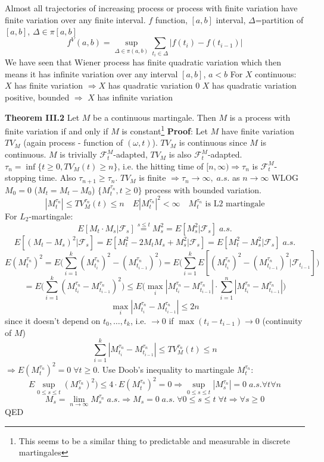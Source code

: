 \documentclass[english]{article}
\newcommand{\note}[1]{\noindent\textbf{#1}}
\newcommand{\F}{\mathcal F}
\begin{document}
Almost all trajectories of increasing process or process with finite variation have finite variation over any finite interval. \newline
$f$ function, $[a,b]$ interval, $\Delta$=partition of $[a,b]$, $\Delta \in \pi[a,b]$
$$f^V(a,b) = \sup_{\Delta \in \pi(a,b)} \sum_{t_i \in \Delta} |f(t_i) - f(t_{i-1})|$$
We have seen that Wiener process has finite quadratic variation which then means it has infinite variation over any interval $[a,b]$, $a<b$ \newline
For $X$ continuous: \newline
$X$ has finite variation $\Rightarrow X$ has quadratic variation $0$ \newline
$X$ has quadratic variation positive, bounded $\Rightarrow$ $X$ has infinite variation \newline

\note{Theorem III.2} Let $M$ be a continuous martingale. Then $M$ is a process with finite variation if and only if $M$ is constant\footnote{This seems to be a similar thing to predictable and measurable in discrete martingales} \newline
\note{Proof}: Let $M$ have finite variation $TV_M$ (again process - function of $(\omega, t)$). $TV_M$ is continuous since $M$ is continuous. $M$ is trivially $\F^M_t$-adapted, $TV_M$ is also $\F^M_t$-adapted. \newline
$\tau_n = \inf\{t\geq 0, TV_M(t) \geq n\}$, i.e. the hitting time of $[n,\infty) \Rightarrow \tau_n$ is $\F^M_t$-stopping time. Also $\tau_{n+1} \geq \tau_n$.\newline
$TV_M$ is finite $\Rightarrow \tau_n \to \infty,\; a.s.$ as $n\to \infty$ \newline
WLOG $M_0=0$ ($M_t = M_t - M_0$) \newline
$\{M^{\tau_n}_t, t\geq 0\}$ process with bounded variation. 
$$|M^{\tau_n}_t| \leq TV^{\tau_n}_M (t) \leq n \quad E|M^{\tau_n}_t |^2 < \infty \quad M^{\tau_n}_t \text{ is L2 martingale}$$
For $L_2$-martingale: 
$$E[M_t \cdot M_s| \F_s] \stackrel{s\leq t}= M^2_s = E[M^2_s | \F_s] \; a.s.$$
$$E[(M_t - M_s)^2 |\F_s] = E[M_t^2 - 2M_t M_s + M_s^2 |\F_s] = E[M_t^2 - M_s^2 |\F_s] \; a.s.$$
$$E(M^{\tau_n}_t)^2 = E \Big( \sum^k_{i=1} (M^{\tau_n}_{t_i})^2 - (M^{\tau_n}_{t_{i-1}})^2 \Big) = E \Big( \sum^k_{i=1} E[ (M^{\tau_n}_{t_i})^2 - (M^{\tau_n}_{t_{i-1}})^2|\F_{t_{i-1}}] \Big) $$
$$=E\Big(\sum^k_{i=1} (M^{\tau_n}_{t_i} - M^{\tau_n}_{t_{i-1}})^2 \Big) \leq E\Big(\max_i | M^{\tau_n}_{t_i} - M^{\tau_n}_{t_{i-1}}| \cdot \sum^n_{i=1} |M^{\tau_n}_{t_i} - M^{\tau_n}_{t_{i-1}}|\Big)$$
$$\max_i |M^{\tau_n}_{t_i} - M^{\tau_n}_{t_{i-1}} | \leq 2n$$
since it doesn't depend on $t_0,\dots, t_k$, i.e. $\to 0$ if $\max(t_i - t_{i-1}) \to 0 $ (continuity of $M$)
$$\sum^k_{i=1} |M^{\tau_n}_{t_i} - M^{\tau_n}_{t_{i-1}} | \leq TV^{\tau_n}_M(t) \leq n$$
$\Rightarrow E(M^{\tau_n}_t)^2 = 0 \; \forall t\geq 0$. Use Doob's inequality to martingale $M^{\tau_n}_t$:
$$E\sup_{0\leq s \leq t} (M^{\tau_n}_s)^2 ) \leq 4 \cdot E(M^{\tau_n}_t )^2 = 0 \Rightarrow \sup_{0\leq s \leq t} |M^{\tau_n}_s| = 0 \; a.s. \forall t \forall n$$
$$M_s = \lim_{n\to \infty} M^{\tau_n}_s \; a.s. \Rightarrow M_s = 0\; a.s. \; \forall 0\leq s \leq t \; \forall t \Rightarrow \forall s \geq 0$$
QED
\end{document}
